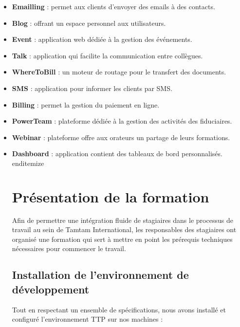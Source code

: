 \begin{itemize}
\begin{itemize}
\begin{itemize}
    \item \textbf{Emailling} : permet aux clients d'envoyer des emails à des contacts.
    
    \item \textbf{Blog} : offrant un espace personnel aux utilisateurs.
    
    \item \textbf{Event} : application web dédiée à la gestion des événements.
    
    \item \textbf{Talk} : application qui facilite la communication entre collègues.
    
    \item \textbf{WhereToBill} : un moteur de routage pour le transfert des documents.
    
    \item \textbf{SMS} : application pour informer les clients par SMS.
    
    \item \textbf{Billing} : permet la gestion du paiement en ligne.
    
    \item \textbf{PowerTeam} : plateforme dédiée à la gestion des activités des fiduciaires.
    
    \item \textbf{Webinar} : plateforme offre aux orateurs un partage de leurs formations.
    
    \item \textbf{Dashboard} : application contient des tableaux de bord personnalisés.
end{itemize}

\section{Présentation de la formation}

Afin de permettre une intégration fluide de stagiaires dans le processus de travail au sein de Tamtam International, les responsables des stagiaires ont organisé une formation qui sert à mettre en point les prérequis techniques nécessaires pour commencer le travail.

\subsection{Installation de l'environnement de développement}

Tout en respectant un ensemble de spécifications, nous avons installé et configuré l'environnement TTP sur nos machines :


\end{itemize}
\end{itemize}
\end{itemize}
